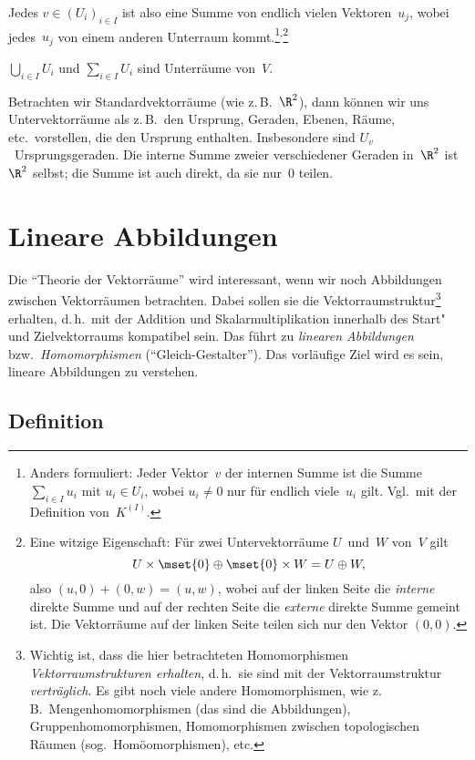 \documentclass[a4paper]{article}
\begin{document}
Jedes $v \in (U_i)_{i\in I}$ ist also eine Summe von endlich vielen Vektoren~$u_j$, wobei jedes~$u_j$ von einem anderen Unterraum kommt.\footnote{Anders formuliert: Jeder Vektor~$v$ der internen Summe ist die Summe $\sum_{i\in I} u_i$ mit $u_i \in U_i$, wobei $u_i \neq 0$ nur für endlich viele~$u_i$ gilt. Vgl.\ mit der Definition von~$K^{(I)}$.}\textsuperscript{,}\footnote{Eine witzige Eigenschaft: Für zwei Untervektorräume $U$~und~$W$ von~$V$ gilt
\begin{equation*}
    U\times\mset{0} \oplus \mset{0}\times W = U \oplus W,
\end{equation*}
also $(u, 0) + (0,w) = (u,w)$, wobei auf der linken Seite die \emph{interne} direkte Summe und auf der rechten Seite die \emph{externe} direkte Summe gemeint ist. Die Vektorräume auf der linken Seite teilen sich nur den Vektor $(0, 0)$.}

\begin{lemma}
    $\bigcup_{i\in I} U_i$ und $\sum_{i\in I} U_i$ sind Unterräume von~$V$.
\end{lemma}

Betrachten wir Standardvektorräume (wie z.\,B.~$\R^2$), dann können wir uns Untervektorräume als z.\,B.\ den Ursprung, Geraden, Ebenen, Räume, etc.\ vorstellen, die den Ursprung enthalten. Insbesondere sind $U_v$~Ursprungsgeraden. Die interne Summe zweier verschiedener Geraden in~$\R^2$ ist~$\R^2$ selbst; die Summe ist auch direkt, da sie nur~$0$ teilen.

\section{Lineare Abbildungen}

Die "`Theorie der Vektorräume"' wird interessant, wenn wir noch Abbildungen zwischen Vektorräumen betrachten. Dabei sollen sie die Vektorraumstruktur\footnote{Wichtig ist, dass die hier betrachteten Homomorphismen \emph{Vektorraumstrukturen erhalten}, d.\,h.\ sie sind mit der Vektorraumstruktur \emph{verträglich}. Es gibt noch viele andere Homomorphismen, wie z.\,B.\ Mengenhomomorphismen (das sind die Abbildungen), Gruppenhomomorphismen, Homomorphismen zwischen topologischen Räumen (sog.\ Homöomorphismen), etc.} erhalten, d.\,h.\ mit der Addition und Skalarmultiplikation innerhalb des Start"~ und Zielvektorraums kompatibel sein. Das führt zu \emph{linearen Abbildungen} bzw.\ \emph{Homomorphismen} ("`Gleich-Gestalter"'). Das vorläufige Ziel wird es sein, lineare Abbildungen zu verstehen.

\subsection{Definition}
\end{document}
